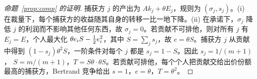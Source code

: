 \begin{proof}[命题~\ref{prop:comp} 的证明]
捕获方 $j$ 的产出为 $Ak_j+\theta E_j$，规则为 $(\sigma_j,s_j)$。(i) 在裁量下，每个捕获方的收益随其自身的转移一比一地下降。(ii) 在承诺下，$\sigma_j$ 降低 $j$ 的利润而不影响其他任何东西，故 $\sigma_j=0$。若贡献不可排他，则对所有 $j$ 有 $E_j=E$，个人最大化
$\theta e_iS-\tfrac{1}{2} e_i^2$，其中 $S=\sum_j s_j$，故 $e=\theta S$。捕获方 $j$ 从贡献中得到
$(1-s_j)\theta^2S$，一阶条件对每个 $j$ 都是 $s_j=1-S$。因此 $s_j=1/(m+1)$，
$S=m/(m+1)$，$T=S\theta\cdot\theta S$。若贡献可排他，每个个人把贡献交给出价份额最高的捕获方，Bertrand 竞争给出 $s=1$，$e=\theta$，$T=\theta^2$。
\end{proof}

{\renewcommand{\em}{}\renewcommand{\emph}[1]{#1}

}


